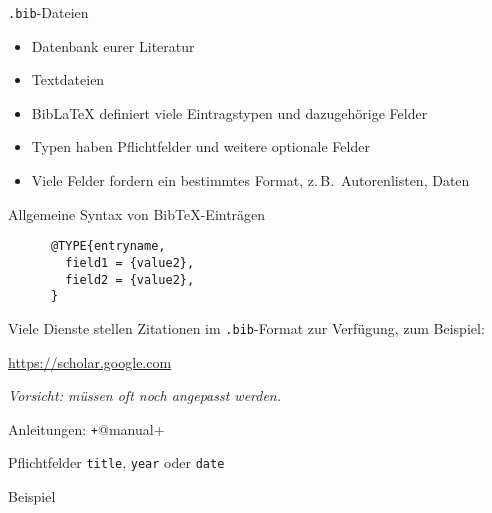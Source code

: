 \begin{frame}[fragile]{\texttt{.bib}-Dateien}
  \begin{itemize}
    \item Datenbank eurer Literatur
    \item Textdateien
    \item Bib\LaTeX{} definiert viele Eintragstypen und dazugehörige Felder
    \item Typen haben Pflichtfelder und weitere optionale Felder
    \item Viele Felder fordern ein bestimmtes Format, z.\,B.\ Autorenlisten, Daten
  \end{itemize}

  \begin{block}{Allgemeine Syntax von BibTeX-Einträgen}
    \begin{verbatim}
      @TYPE{entryname,
        field1 = {value2},
        field2 = {value2},
      }
    \end{verbatim}
  \end{block}


  Viele Dienste stellen Zitationen im \texttt{.bib}-Format zur Verfügung, zum Beispiel:
  \begin{center}
    \url{https://scholar.google.com}
  \end{center}

  \emph{Vorsicht: müssen oft noch angepasst werden.}
\end{frame}


\begin{frame}[fragile]{Anleitungen: \texttt+@manual+}
  \begin{block}{Pflichtfelder}
    \texttt{title}, \hspace{2em}
    \texttt{year} oder \texttt{date}
  \end{block}

  \begin{block}{Beispiel}
    \inputminted[firstline=56, lastline=60]{bibtex}{examples.bib}
  \end{block}
\end{frame}

